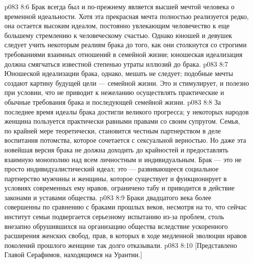\vs p083 8:6 \pc Брак всегда был и по\hyp{}прежнему является высшей мечтой человека о временной идеальности. Хотя эта прекрасная мечта полностью реализуется редко, она остается высоким идеалом, постоянно увлекающим человечество к еще большему стремлению к человеческому счастью. Однако юношей и девушек следует учить некоторым реалиям брака до того, как они столкнутся со строгими требованиями взаимных отношений в семейной жизни; юношеская идеализация должна смягчаться известной степенью утраты иллюзий до брака.
\vs p083 8:7 Юношеской идеализации брака, однако, мешать не следует; подобные мечты создают картину будущей цели --- семейной жизни. Это и стимулирует, и полезно при условии, что не приводит к нежеланию осуществлять практические и обычные требования брака и последующей семейной жизни.
\vs p083 8:8 За последнее время идеалы брака достигли великого прогресса; у некоторых народов женщина пользуется практически равными правами со своим супругом. Семья, по крайней мере теоретически, становится честным партнерством в деле воспитания потомства, которое сочетается с сексуальной верностью. Но даже эта новейшая версия брака не должна доходить до крайностей и предоставлять взаимную монополию над всем личностным и индивидуальным. Брак --- это не просто индивидуалистический идеал; это --- развивающееся социальное партнерство мужчины и женщины, которое существует и функционирует в условиях современных ему нравов, ограничено табу и приводится в действие законами и уставами общества.
\vs p083 8:9 Браки двадцатого века более совершенны по сравнению с браками прошлых веков, несмотря на то, что сейчас институт семьи подвергается серьезному испытанию из\hyp{}за проблем, столь внезапно обрушившихся на организацию общества вследствие ускоренного расширения женских свобод, прав, в которых в ходе медленной эволюции нравов поколений прошлого женщине так долго отказывали.
\vsetoff
\vs p083 8:10 [Представлено Главой Серафимов, находящимся на Урантии.]

